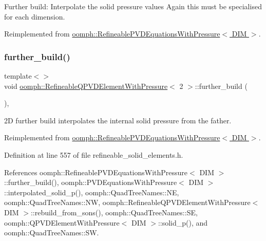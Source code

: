 Further build\+: Interpolate the solid pressure values Again this must be specialised for each dimension. 



Reimplemented from \hyperlink{classoomph_1_1RefineablePVDEquationsWithPressure_aad92965f2aec749e75580d003eebdc91}{oomph\+::\+Refineable\+P\+V\+D\+Equations\+With\+Pressure$<$ D\+I\+M $>$}.

\mbox{\label{classoomph_1_1RefineableQPVDElementWithPressure_ab4406f1c6de1e8e2e704bd55a9409c87}} 
\subsubsection{\texorpdfstring{further\+\_\+build()}{further\_build()}\hspace{0.1cm}{\footnotesize\ttfamily [2/3]}}
{\footnotesize\ttfamily template$<$$>$ \\
void \hyperlink{classoomph_1_1RefineableQPVDElementWithPressure}{oomph\+::\+Refineable\+Q\+P\+V\+D\+Element\+With\+Pressure}$<$ 2 $>$\+::further\+\_\+build (\begin{DoxyParamCaption}{ }\end{DoxyParamCaption})\hspace{0.3cm}{\ttfamily [inline]}, {\ttfamily [virtual]}}

2D further build interpolates the internal solid pressure from the father. 

Reimplemented from \hyperlink{classoomph_1_1RefineablePVDEquationsWithPressure_aad92965f2aec749e75580d003eebdc91}{oomph\+::\+Refineable\+P\+V\+D\+Equations\+With\+Pressure$<$ D\+I\+M $>$}.



Definition at line 557 of file refineable\+\_\+solid\+\_\+elements.\+h.



References oomph\+::\+Refineable\+P\+V\+D\+Equations\+With\+Pressure$<$ D\+I\+M $>$\+::further\+\_\+build(), oomph\+::\+P\+V\+D\+Equations\+With\+Pressure$<$ D\+I\+M $>$\+::interpolated\+\_\+solid\+\_\+p(), oomph\+::\+Quad\+Tree\+Names\+::\+NE, oomph\+::\+Quad\+Tree\+Names\+::\+NW, oomph\+::\+Refineable\+Q\+P\+V\+D\+Element\+With\+Pressure$<$ D\+I\+M $>$\+::rebuild\+\_\+from\+\_\+sons(), oomph\+::\+Quad\+Tree\+Names\+::\+SE, oomph\+::\+Q\+P\+V\+D\+Element\+With\+Pressure$<$ D\+I\+M $>$\+::solid\+\_\+p(), and oomph\+::\+Quad\+Tree\+Names\+::\+SW.

